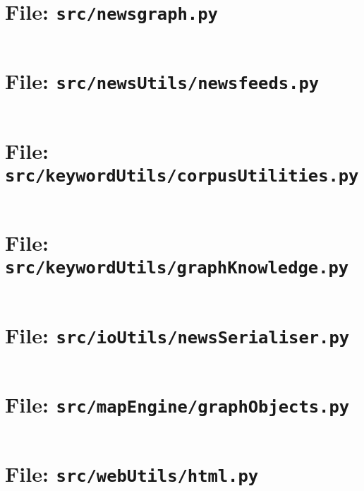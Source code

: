 \begin{landscape}

\hspace{-3.5cm}\begin{multicols}{2}

\section{File: \texttt{src/newsgraph.py}} \label{sec:newsgraph.py}
\inputminted[fontsize=\scriptsize,linenos,numbersep=5pt]{Python}{../src/newsgraph.py}

\section{File: \texttt{src/newsUtils/newsfeeds.py}} \label{sec:newsfeeds.py}
\inputminted[fontsize=\scriptsize,linenos,numbersep=5pt]{Python}{../src/newsUtils/newsfeeds.py}

\section{File: \texttt{src/keywordUtils/corpusUtilities.py}} \label{sec:corpusUtilities.py}
\inputminted[fontsize=\scriptsize,linenos,numbersep=5pt]{Python}{../src/keywordUtils/corpusUtilities.py}

\section{File: \texttt{src/keywordUtils/graphKnowledge.py}} \label{sec:graphKnowledge.py}
\inputminted[fontsize=\scriptsize,linenos,numbersep=5pt]{Python}{../src/keywordUtils/graphKnowledge.py}

\section{File: \texttt{src/ioUtils/newsSerialiser.py}} \label{sec:newsSerialiser.py}
\inputminted[fontsize=\scriptsize,linenos,numbersep=5pt]{Python}{../src/ioUtils/newsSerialiser.py}

\section{File: \texttt{src/mapEngine/graphObjects.py}} \label{sec:graphObjects.py}
\inputminted[fontsize=\scriptsize,linenos,numbersep=5pt]{Python}{../src/mapEngine/graphObjects.py}

\section{File: \texttt{src/webUtils/html.py}} \label{sec:html.py}
\inputminted[fontsize=\scriptsize,linenos,numbersep=5pt]{Python}{../src/webUtils/html.py}


\end{multicols}
\end{landscape}

